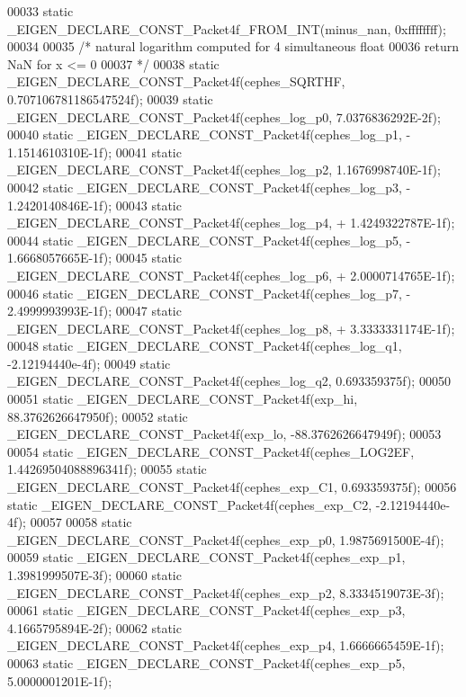 \begin{DoxyCode}
00033 \textcolor{keyword}{static} \_EIGEN\_DECLARE\_CONST\_Packet4f\_FROM\_INT(minus\_nan,     0xffffffff);
00034   
00035 \textcolor{comment}{/* natural logarithm computed for 4 simultaneous float}
00036 \textcolor{comment}{  return NaN for x <= 0}
00037 \textcolor{comment}{*/}
00038 \textcolor{keyword}{static} \_EIGEN\_DECLARE\_CONST\_Packet4f(cephes\_SQRTHF, 0.707106781186547524f);
00039 \textcolor{keyword}{static} \_EIGEN\_DECLARE\_CONST\_Packet4f(cephes\_log\_p0, 7.0376836292E-2f);
00040 \textcolor{keyword}{static} \_EIGEN\_DECLARE\_CONST\_Packet4f(cephes\_log\_p1, - 1.1514610310E-1f);
00041 \textcolor{keyword}{static} \_EIGEN\_DECLARE\_CONST\_Packet4f(cephes\_log\_p2, 1.1676998740E-1f);
00042 \textcolor{keyword}{static} \_EIGEN\_DECLARE\_CONST\_Packet4f(cephes\_log\_p3, - 1.2420140846E-1f);
00043 \textcolor{keyword}{static} \_EIGEN\_DECLARE\_CONST\_Packet4f(cephes\_log\_p4, + 1.4249322787E-1f);
00044 \textcolor{keyword}{static} \_EIGEN\_DECLARE\_CONST\_Packet4f(cephes\_log\_p5, - 1.6668057665E-1f);
00045 \textcolor{keyword}{static} \_EIGEN\_DECLARE\_CONST\_Packet4f(cephes\_log\_p6, + 2.0000714765E-1f);
00046 \textcolor{keyword}{static} \_EIGEN\_DECLARE\_CONST\_Packet4f(cephes\_log\_p7, - 2.4999993993E-1f);
00047 \textcolor{keyword}{static} \_EIGEN\_DECLARE\_CONST\_Packet4f(cephes\_log\_p8, + 3.3333331174E-1f);
00048 \textcolor{keyword}{static} \_EIGEN\_DECLARE\_CONST\_Packet4f(cephes\_log\_q1, -2.12194440e-4f);
00049 \textcolor{keyword}{static} \_EIGEN\_DECLARE\_CONST\_Packet4f(cephes\_log\_q2, 0.693359375f);
00050 
00051 \textcolor{keyword}{static} \_EIGEN\_DECLARE\_CONST\_Packet4f(exp\_hi,  88.3762626647950f);
00052 \textcolor{keyword}{static} \_EIGEN\_DECLARE\_CONST\_Packet4f(exp\_lo, -88.3762626647949f);
00053 
00054 \textcolor{keyword}{static} \_EIGEN\_DECLARE\_CONST\_Packet4f(cephes\_LOG2EF, 1.44269504088896341f);
00055 \textcolor{keyword}{static} \_EIGEN\_DECLARE\_CONST\_Packet4f(cephes\_exp\_C1, 0.693359375f);
00056 \textcolor{keyword}{static} \_EIGEN\_DECLARE\_CONST\_Packet4f(cephes\_exp\_C2, -2.12194440e-4f);
00057 
00058 \textcolor{keyword}{static} \_EIGEN\_DECLARE\_CONST\_Packet4f(cephes\_exp\_p0, 1.9875691500E-4f);
00059 \textcolor{keyword}{static} \_EIGEN\_DECLARE\_CONST\_Packet4f(cephes\_exp\_p1, 1.3981999507E-3f);
00060 \textcolor{keyword}{static} \_EIGEN\_DECLARE\_CONST\_Packet4f(cephes\_exp\_p2, 8.3334519073E-3f);
00061 \textcolor{keyword}{static} \_EIGEN\_DECLARE\_CONST\_Packet4f(cephes\_exp\_p3, 4.1665795894E-2f);
00062 \textcolor{keyword}{static} \_EIGEN\_DECLARE\_CONST\_Packet4f(cephes\_exp\_p4, 1.6666665459E-1f);
00063 \textcolor{keyword}{static} \_EIGEN\_DECLARE\_CONST\_Packet4f(cephes\_exp\_p5, 5.0000001201E-1f);

\end{DoxyCode}
